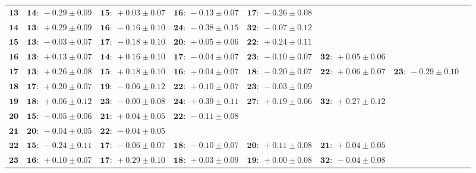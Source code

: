 \documentclass[letter,12pt]{article}
\begin{document}
\begin{landscape}
    \begin{table}[!h]
        \begin{tabular}{r|lllllll}
            \hline
            \( \mathbf{13} \)& \( \mathbf{14:}~-0.29 \pm 0.09 \)& \( \mathbf{15:}~+0.03 \pm 0.07 \)& \( \mathbf{16:}~-0.13 \pm 0.07 \)& \( \mathbf{17:}~-0.26 \pm 0.08 \)\\ 
            \( \mathbf{14} \)& \( \mathbf{13:}~+0.29 \pm 0.09 \)& \( \mathbf{16:}~-0.16 \pm 0.10 \)& \( \mathbf{24:}~-0.38 \pm 0.15 \)& \( \mathbf{32:}~-0.07 \pm 0.12 \)\\ 
            \( \mathbf{15} \)& \( \mathbf{13:}~-0.03 \pm 0.07 \)& \( \mathbf{17:}~-0.18 \pm 0.10 \)& \( \mathbf{20:}~+0.05 \pm 0.06 \)& \( \mathbf{22:}~+0.24 \pm 0.11 \)\\ 
            \( \mathbf{16} \)& \( \mathbf{13:}~+0.13 \pm 0.07 \)& \( \mathbf{14:}~+0.16 \pm 0.10 \)& \( \mathbf{17:}~-0.04 \pm 0.07 \)& \( \mathbf{23:}~-0.10 \pm 0.07 \)& \( \mathbf{32:}~+0.05 \pm 0.06 \)\\ 
            \( \mathbf{17} \)& \( \mathbf{13:}~+0.26 \pm 0.08 \)& \( \mathbf{15:}~+0.18 \pm 0.10 \)& \( \mathbf{16:}~+0.04 \pm 0.07 \)& \( \mathbf{18:}~-0.20 \pm 0.07 \)& \( \mathbf{22:}~+0.06 \pm 0.07 \)& \( \mathbf{23:}~-0.29 \pm 0.10 \)\\ 
            \( \mathbf{18} \)& \( \mathbf{17:}~+0.20 \pm 0.07 \)& \( \mathbf{19:}~-0.06 \pm 0.12 \)& \( \mathbf{22:}~+0.10 \pm 0.07 \)& \( \mathbf{23:}~-0.03 \pm 0.09 \)\\ 
            \( \mathbf{19} \)& \( \mathbf{18:}~+0.06 \pm 0.12 \)& \( \mathbf{23:}~-0.00 \pm 0.08 \)& \( \mathbf{24:}~+0.39 \pm 0.11 \)& \( \mathbf{27:}~+0.19 \pm 0.06 \)& \( \mathbf{32:}~+0.27 \pm 0.12 \)\\ 
            \( \mathbf{20} \)& \( \mathbf{15:}~-0.05 \pm 0.06 \)& \( \mathbf{21:}~+0.04 \pm 0.05 \)& \( \mathbf{22:}~-0.11 \pm 0.08 \)\\ 
            \( \mathbf{21} \)& \( \mathbf{20:}~-0.04 \pm 0.05 \)& \( \mathbf{22:}~-0.04 \pm 0.05 \)\\ 
            \( \mathbf{22} \)& \( \mathbf{15:}~-0.24 \pm 0.11 \)& \( \mathbf{17:}~-0.06 \pm 0.07 \)& \( \mathbf{18:}~-0.10 \pm 0.07 \)& \( \mathbf{20:}~+0.11 \pm 0.08 \)& \( \mathbf{21:}~+0.04 \pm 0.05 \)\\ 
            \( \mathbf{23} \)& \( \mathbf{16:}~+0.10 \pm 0.07 \)& \( \mathbf{17:}~+0.29 \pm 0.10 \)& \( \mathbf{18:}~+0.03 \pm 0.09 \)& \( \mathbf{19:}~+0.00 \pm 0.08 \)& \( \mathbf{32:}~-0.04 \pm 0.08 \)\\ 

\end{tabular}
\end{table}
\end{landscape}
\end{document}

